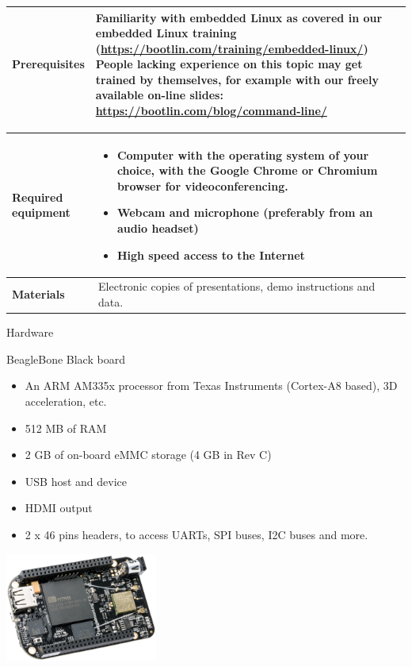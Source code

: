 \documentclass[a4paper,12pt,obeyspaces,spaces,hyphens]{article}
\begin{document}
{\begin{tabularx}{\textwidth}{|g|h|}
    {\bf Prerequisites} & {\bf Familiarity with embedded Linux} as covered
    in our embedded Linux training
    (\url{https://bootlin.com/training/embedded-linux/}) \vspace{1em}
    \newline People lacking experience on this topic may get
    trained by themselves, for example with our freely available
    on-line slides:
    \url{https://bootlin.com/blog/command-line/} \\
    \hline
  \end{tabularx}

  \begin{tabularx}{\textwidth}{|g|h|}
    {\bf Required equipment} &
    \begin{itemize}
    \item Computer with the operating system of your choice, with the
          Google Chrome or Chromium browser for videoconferencing.
    \item Webcam and microphone (preferably from an audio headset)
    \item High speed access to the Internet
    \end{itemize}\\
    \hline

    {\bf Materials} & Electronic copies of presentations,
    demo instructions and data.\\
    \hline

\end{tabularx}}
\normalsize

\feagendatwocolumn
{Hardware}
{
  BeagleBone Black board
  \begin{itemize}
  \item An ARM AM335x processor from Texas Instruments (Cortex-A8
    based), 3D acceleration, etc.
  \item 512 MB of RAM
  \item 2 GB of on-board eMMC storage
        \newline(4 GB in Rev C)
  \item USB host and device
  \item HDMI output
  \item 2 x 46 pins headers, to access UARTs, SPI buses, I2C buses
    and more.
  \end{itemize}
}
{}
{
  \begin{flushright}
  \includegraphics[width=5cm]{../slides/beagleboneblack-board/beagleboneblack.png}
  \end{flushright}
}
\end{document}
